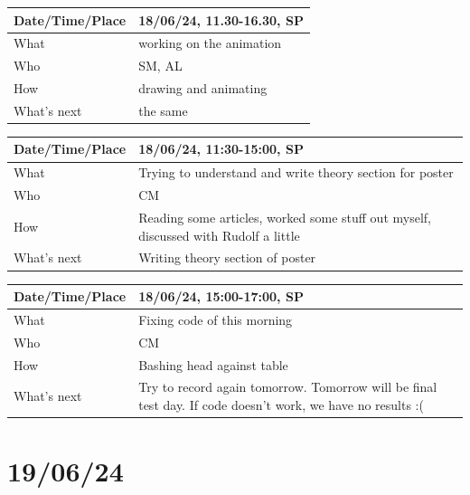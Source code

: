 \documentclass{article}
\begin{document}
\begin{table}[H]
\begin{tabular}{|p{1.5in}|p{4in}|}
\hline
Date/Time/Place & 18/06/24, 11.30-16.30, SP\\ \hline
What            &  working on the animation\\ \hline
Who             &  SM, AL\\ \hline
How             &  drawing and animating\\ \hline
What's next     &  the same\\ \hline
\end{tabular}
\end{table}

\begin{table}[H]
\begin{tabular}{|p{1.5in}|p{4in}|}
\hline
Date/Time/Place &  18/06/24, 11:30-15:00, SP\\ \hline
What            &  Trying to understand and write theory section for poster\\ \hline
Who             &  CM\\ \hline
How             &  Reading some articles, worked some stuff out myself, discussed with Rudolf a little\\ \hline
What's next     &  Writing theory section of poster\\ \hline
\end{tabular}
\end{table}

\begin{table}[H]
\begin{tabular}{|p{1.5in}|p{4in}|}
\hline
Date/Time/Place &  18/06/24, 15:00-17:00, SP\\ \hline
What            &  Fixing code of this morning\\ \hline
Who             &  CM\\ \hline
How             &  Bashing head against table\\ \hline
What's next     &  Try to record again tomorrow. Tomorrow will be final test day. If code doesn't work, we have no results :(\\ \hline
\end{tabular}
\end{table}

\section{19/06/24}
\end{document}
